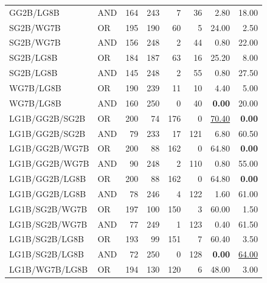 \documentclass{article}
\begin{document}
{\begin{longtable}{llrrrrrr}
 GG2B/LG8B                & AND     &  164 &  243 &    7 &   36 & 2.80              & 18.00             \\
 SG2B/WG7B                & OR      &  195 &  190 &   60 &    5 & 24.00             & 2.50              \\
 SG2B/WG7B                & AND     &  156 &  248 &    2 &   44 & 0.80              & 22.00             \\
 SG2B/LG8B                & OR      &  184 &  187 &   63 &   16 & 25.20             & 8.00              \\
 SG2B/LG8B                & AND     &  145 &  248 &    2 &   55 & 0.80              & 27.50             \\
 WG7B/LG8B                & OR      &  190 &  239 &   11 &   10 & 4.40              & 5.00              \\
 WG7B/LG8B                & AND     &  160 &  250 &    0 &   40 & \textbf{0.00}     & 20.00             \\
 LG1B/GG2B/SG2B           & OR      &  200 &   74 &  176 &    0 & \underline{70.40} & \textbf{0.00}     \\
 LG1B/GG2B/SG2B           & AND     &   79 &  233 &   17 &  121 & 6.80              & 60.50             \\
 LG1B/GG2B/WG7B           & OR      &  200 &   88 &  162 &    0 & 64.80             & \textbf{0.00}     \\
 LG1B/GG2B/WG7B           & AND     &   90 &  248 &    2 &  110 & 0.80              & 55.00             \\
 LG1B/GG2B/LG8B           & OR      &  200 &   88 &  162 &    0 & 64.80             & \textbf{0.00}     \\
 LG1B/GG2B/LG8B           & AND     &   78 &  246 &    4 &  122 & 1.60              & 61.00             \\
 LG1B/SG2B/WG7B           & OR      &  197 &  100 &  150 &    3 & 60.00             & 1.50              \\
 LG1B/SG2B/WG7B           & AND     &   77 &  249 &    1 &  123 & 0.40              & 61.50             \\
 LG1B/SG2B/LG8B           & OR      &  193 &   99 &  151 &    7 & 60.40             & 3.50              \\
 LG1B/SG2B/LG8B           & AND     &   72 &  250 &    0 &  128 & \textbf{0.00}     & \underline{64.00} \\
 LG1B/WG7B/LG8B           & OR      &  194 &  130 &  120 &    6 & 48.00             & 3.00              \\

\end{longtable}}
\end{document}
